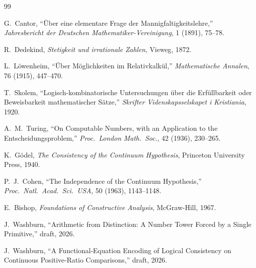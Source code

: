 \documentclass[11pt,a4paper]{article}
\theoremstyle{definition}
\theoremstyle{remark}
\begin{document}
\begin{thebibliography}{99}

G.~Cantor,
``\"Uber eine elementare Frage der Mannigfaltigkeitslehre,''
\emph{Jahresbericht der Deutschen Mathematiker-Vereinigung}, 1 (1891), 75--78.

R.~Dedekind,
\emph{Stetigkeit und irrationale Zahlen},
Vieweg, 1872.

L.~L\"owenheim,
``\"Uber M\"oglichkeiten im Relativkalk\"ul,''
\emph{Mathematische Annalen}, 76 (1915), 447--470.

T.~Skolem,
``Logisch-kombinatorische Untersuchungen \"uber die Erf\"ullbarkeit oder
Beweisbarkeit mathematischer S\"atze,''
\emph{Skrifter Videnskapsselskapet i Kristiania}, 1920.

A.~M.~Turing,
``On Computable Numbers, with an Application to the Entscheidungsproblem,''
\emph{Proc.\ London Math.\ Soc.}, 42 (1936), 230--265.

K.~G\"odel,
\emph{The Consistency of the Continuum Hypothesis},
Princeton University Press, 1940.

P.~J.~Cohen,
``The Independence of the Continuum Hypothesis,''
\emph{Proc.\ Natl.\ Acad.\ Sci.\ USA}, 50 (1963), 1143--1148.

E.~Bishop,
\emph{Foundations of Constructive Analysis},
McGraw-Hill, 1967.

J.~Washburn,
``Arithmetic from Distinction: A Number Tower Forced by a Single Primitive,''
draft, 2026.

J.~Washburn,
``A Functional-Equation Encoding of Logical Consistency on Continuous
Positive-Ratio Comparisons,'' draft, 2026.

\end{thebibliography}
\end{document}

